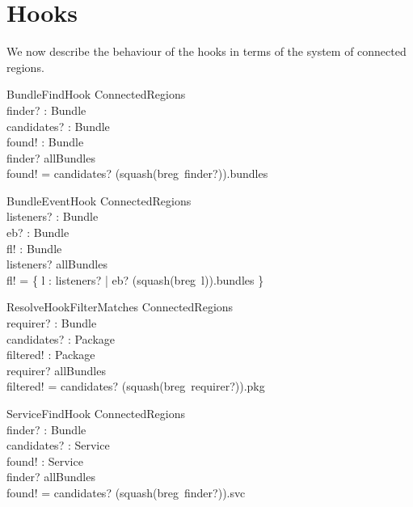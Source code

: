 \documentclass[a4paper,9pt]{article}
\begin{document}
\clearpage
\section{Hooks}
\label{cha:hooks}

We now describe the behaviour of the hooks in terms of the system of connected regions.

\begin{schema}{BundleFindHook}
  \Xi ConnectedRegions \\
  finder? : Bundle \\
  candidates? : \power Bundle \\
  found! : \power Bundle \\
\where
  finder? \in allBundles \\
  found! = candidates? \cap (squash(breg~finder?)).bundles \\
\end{schema}

\begin{schema}{BundleEventHook}
  \Xi ConnectedRegions \\
  listeners? : \power Bundle \\
  eb? : Bundle \\
  fl! : \power Bundle \\
\where
  listeners? \subseteq allBundles \\
  fl! = \{ l : listeners? | eb? \in (squash(breg~l)).bundles \} \\
\end{schema}

\begin{schema}{ResolveHookFilterMatches}
  \Xi ConnectedRegions \\
  requirer? : Bundle \\
  candidates? : \power Package \\
  filtered! : \power Package \\
\where
  requirer? \in allBundles \\
  filtered! = candidates? \cap (squash(breg~requirer?)).pkg \\
\end{schema}

\begin{schema}{ServiceFindHook}
  \Xi ConnectedRegions \\
  finder? : Bundle \\
  candidates? : \power Service \\
  found! : \power Service \\
\where
  finder? \in allBundles \\
  found! = candidates? \cap (squash(breg~finder?)).svc \\
\end{schema}
\end{document}
